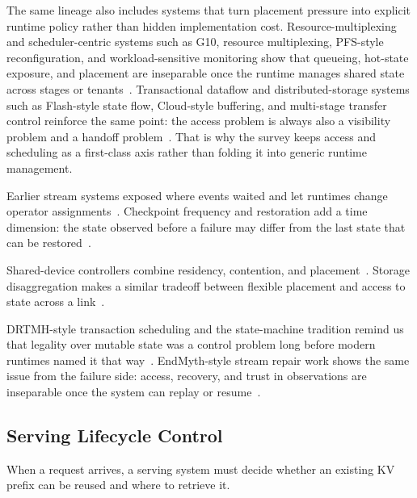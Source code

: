 The same lineage also includes systems that turn placement pressure into explicit runtime policy rather than hidden implementation cost. Resource-multiplexing and scheduler-centric systems such as G10, resource multiplexing, PFS-style reconfiguration, and workload-sensitive monitoring show that queueing, hot-state exposure, and placement are inseparable once the runtime manages shared state across stages or tenants~\cite{jiang2024megascale,he2025resourcemultiplexing,domingo2021pfsck,jiang2025shadowviews}. Transactional dataflow and distributed-storage systems such as Flash-style state flow, Cloud-style buffering, and multi-stage transfer control reinforce the same point: the access problem is always also a visibility problem and a handoff problem~\cite{fu2022sfs,fu2024autocheck,gao2025deck,li2020pegasus}. That is why the survey keeps access and scheduling as a first-class axis rather than folding it into generic runtime management.

Earlier stream systems exposed where events waited and let runtimes change operator assignments~\cite{zhang2016corun,zhang2016elastic,zhang2019briskstream}. Checkpoint frequency and restoration add a time dimension: the state observed before a failure may differ from the last state that can be restored~\cite{mohan2021checkfreq,eisenman2022checknrun}.

Shared-device controllers combine residency, contention, and placement~\cite{cai2025moc,feng2025optimus,fsmoe25,wang2025wlbllm,huang2025tigon,zheng2024vmcu,tabatabai2024fbmm}. Storage disaggregation makes a similar tradeoff between flexible placement and access to state across a link~\cite{vuppalapati2020snowflake,zhou2024neomem}.

DRTMH-style transaction scheduling and the state-machine tradition remind us that legality over mutable state was a control problem long before modern runtimes named it that way~\cite{ren2015drtmh,schneider1990state}. EndMyth-style stream repair work shows the same issue from the failure side: access, recovery, and trust in observations are inseparable once the system can replay or resume~\cite{zamanian2017endmyth}.

\subsection{Serving Lifecycle Control}

When a request arrives, a serving system must decide whether an existing KV prefix can be reused and where to retrieve it.

